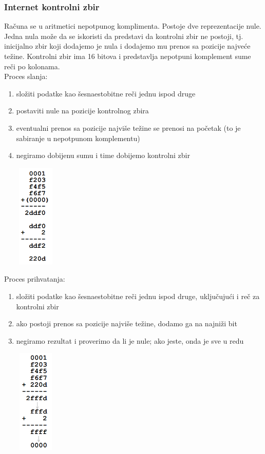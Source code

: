 \documentclass{article} %
\begin{document}
\subsubsection{Internet kontrolni zbir}
Računa se u aritmetici nepotpunog komplimenta. Postoje dve reprezentacije nule. Jedna nula može da se iskoristi da predstavi da kontrolni zbir ne postoji, tj. inicijalno zbir koji dodajemo je nula i dodajemo mu prenos sa pozicije najveće težine. Kontrolni zbir ima 16 bitova i predstavlja nepotpuni komplement sume reči po kolonama.\\
Proces slanja:\\
\begin{enumerate}
\item složiti podatke kao šesnaestobitne reči jednu ispod druge
\item postaviti nule na pozicije kontrolnog zbira
\item eventualni prenos sa pozicije najviše težine  se prenosi na početak (to je sabiranje u nepotpunom komplementu)
\item negiramo dobijenu sumu i time dobijemo kontrolni zbir
\begin{center}
\includegraphics[width=2cm, height=5cm]{kontZbir}\\
\end{center}
\end{enumerate}
Proces prihvatanja:
\begin{enumerate}
\item složiti podatke kao šesnaestobitne reči jednu ispod druge, uključujući i reč za kontrolni zbir
\item ako postoji prenos sa pozicije najviše težine, dodamo ga na najniži bit
\item  negiramo rezultat i proverimo da li je nule; ako jeste, onda je sve u redu
\begin{center}
\includegraphics[width=2cm, height=5cm]{kontZbir2}\\
\end{center}
\end{enumerate}
\end{document}
